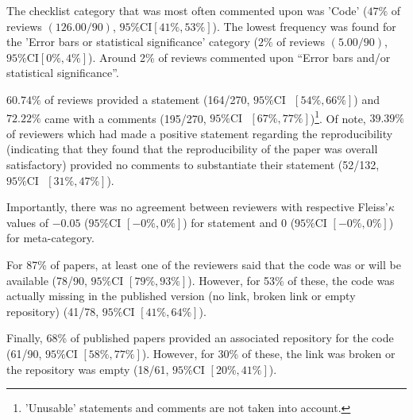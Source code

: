 The checklist category that was most often commented upon was 'Code' ($47\%$ of reviews $(126.00/90)$, $95\% \text{CI} [41\%, 53\%]$).
The lowest frequency was found for the 'Error bars or statistical significance' category ($2\%$ of reviews $(5.00/90)$, $95\% \text{CI} [0\%, 4\%]$).
Around 2\% of reviews commented upon “Error bars and/or statistical significance”.

$60.74\%$ of reviews provided a statement (164/270, $95\% \text{CI }$ $[54\%, 66\%]$) and 
$72.22\%$ came with a comments (195/270, $95\% \text{CI }$ $[67\%, 77\%]$)\footnote{'Unusable' statements and comments are not taken into account.}. 
Of note, $39.39\%$ of reviewers which had made a positive statement regarding the reproducibility (indicating that they found that the reproducibility of the paper was overall satisfactory) provided no comments to substantiate their statement (52/132, $95\% \text{CI }$ $[31\%, 47\%]$).

Importantly, there was no agreement between reviewers with respective Fleiss'$\kappa$ values of $-0.05$ ($95\% \text{CI } [-0\%, 0\%]$) for statement 
and $0$ ($95\% \text{CI } [-0\%, 0\%]$) for meta-category.

For 87\% of papers, at least one of the reviewers said that the code was or will be available (78/90, $95\%\text{CI } [79\%, 93\%]$). 
However, for 53\% of these,  the code was actually missing in the published version (no link, broken link or empty repository) (41/78, $95\%\text{CI } [41\%, 64\%]$). 

Finally, 68\% of published papers provided an associated repository for the code (61/90, $95\%\text{CI } [58\%, 77\%]$). 
However, for 30\% of these, the link was broken or the repository was empty (18/61, $95\%\text{CI } [20\%, 41\%]$). 

